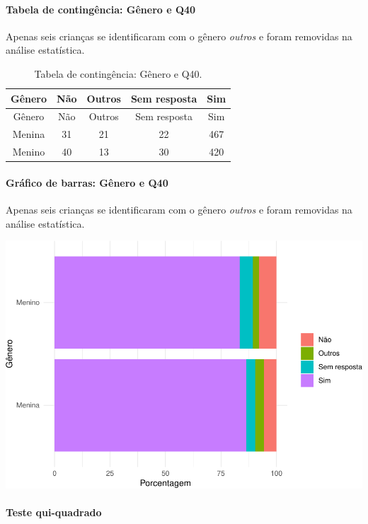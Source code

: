 \documentclass[]{article}
\let\oldparagraph\paragraph
\renewcommand{\paragraph}[1]{\oldparagraph{#1}\mbox{}}
\begin{document}
\cleardoublepage

\hypertarget{tabela-de-continguxeancia-guxeanero-e-q40}{%
\paragraph{Tabela de contingência: Gênero e Q40}\label{tabela-de-continguxeancia-guxeanero-e-q40}}

Apenas seis crianças se identificaram com o gênero \emph{outros} e foram removidas na análise estatística.

\begin{longtable}[]{@{}ccccc@{}}
\caption{\label{tab:unnamed-chunk-1557}Tabela de contingência: Gênero e Q40.}\tabularnewline
\toprule
Gênero & Não & Outros & Sem resposta & Sim\tabularnewline
\midrule
\endfirsthead
\toprule
Gênero & Não & Outros & Sem resposta & Sim\tabularnewline
\midrule
\endhead
Menina & 31 & 21 & 22 & 467\tabularnewline
Menino & 40 & 13 & 30 & 420\tabularnewline
\bottomrule
\end{longtable}

\hypertarget{gruxe1fico-de-barras-guxeanero-e-q40}{%
\paragraph{Gráfico de barras: Gênero e Q40}\label{gruxe1fico-de-barras-guxeanero-e-q40}}

Apenas seis crianças se identificaram com o gênero \emph{outros} e foram removidas na análise estatística.

\begin{center}\includegraphics[width=0.75\linewidth]{relatorio_covid19_files/figure-latex/unnamed-chunk-1558-1} \end{center}

\hypertarget{teste-qui-quadrado-133}{%
\paragraph{Teste qui-quadrado}\label{teste-qui-quadrado-133}}
\end{document}
